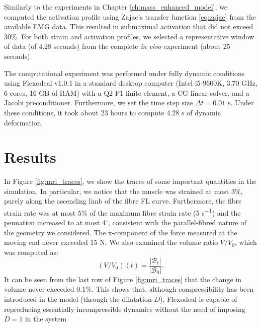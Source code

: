 \documentclass{sfuthesis}
\numberwithin{equation}{section}
\numberwithin{figure}{chapter}
\numberwithin{table}{chapter}
\theoremstyle{definition}
\newcommand{\B}{\mathcal{B}}
\begin{document}
Similarly to the experiments in Chapter \ref{ch:mass_enhanced_model}, we computed the activation profile using Zajac's transfer function \eqref{eq:zajac} from the available EMG data. This resulted in submaximal activation that did not exceed 30\%. For both strain and activation profiles, we selected a representative window of data (of 4.28 seconds) from the complete \textit{in vivo} experiment (about 25 seconds).

The computational experiment was performed under fully dynamic conditions using Flexodeal v1.0.1 in a standard desktop computer (Intel i5-9600K, 3.70 GHz, 6 cores, 16 GB of RAM) with a Q2-P1 finite element, a CG linear solver, and a Jacobi preconditioner. Furthermore, we set the time step size $\Delta t  = 0.01$ s. Under these conditions, it took about 23 hours to compute 4.28 s of dynamic deformation.

\section{Results}

In Figure \ref{fig:mri_traces}, we show the traces of some important quantities in the simulation. In particular, we notice that the muscle was strained at most 3\%, purely along the ascending limb of the fibre FL curve. Furthermore, the fibre strain rate was at most 5\% of the maximum fibre strain rate (5 \unit{s^{-1}}) and the pennation increased to at most 4$^\circ$, consistent with the parallel-fibred nature of the geometry we considered. The x-component of the force measured at the moving end never exceeded 15 N. We also examined the volume ratio $V/V_0$, which was computed as:
\[
(V/V_0)(t) = \frac{|\B_t|}{|\B_0|}.
\]
It can be seen from the last row of Figure \ref{fig:mri_traces} that the change in volume never exceeded 0.1\%. This shows that, although compressibility has been introduced in the model (through the dilatation $D$), Flexodeal is capable of reproducing essentially incompressible dynamics without the need of imposing $D = 1$ in the system
\end{document}
